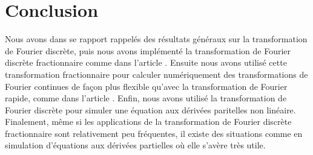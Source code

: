 \documentclass{article}
\begin{document}
\begin{center}
\end{center}


\begin{center}
\end{center}



\section{Conclusion}

Nous avons dans se rapport rappelés des résultats généraux sur la transformation de Fourier discrète, puis nous avons implémenté la transformation de Fourier discrète fractionnaire comme dans l'article \cite{FRAC}. 
Ensuite nous avons utilisé cette transformation fractionnaire pour calculer numériquement des transformations de Fourier continues de façon plus flexible qu'avec la transformation de Fourier rapide, comme dans l'article \cite{FOURINT}. 
Enfin, nous avons utilisé la transformation de Fourier discrète pour simuler une équation aux dérivées paritelles non linéaire.
Finalement, même si les applications de la transformation de Fourier discrète fractionnaire sont relativement peu fréquentes, il existe des situations comme en simulation d'équations aux dérivées partielles où elle s'avère très utile.



\clearpage




\clearpage
\appendix
\end{document}
